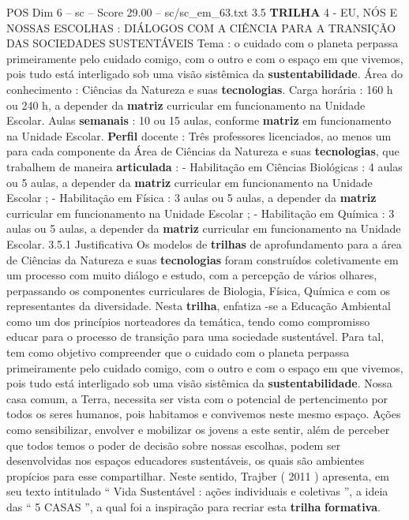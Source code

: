 \begin{textsample}{POS Dim 6 – sc – Score 29.00 – sc/sc\_em\_63.txt}  \label{ex:f6_pos_006}
3.5 \textbf{TRILHA} 4 - EU, NÓS E NOSSAS ESCOLHAS : DIÁLOGOS COM A CIÊNCIA PARA A TRANSIÇÃO DAS SOCIEDADES SUSTENTÁVEIS Tema : o cuidado com o planeta perpassa primeiramente pelo cuidado comigo, com o outro e com o espaço em que vivemos, pois tudo está interligado sob uma visão sistêmica da \textbf{sustentabilidade}.
Área do conhecimento : Ciências da Natureza e suas \textbf{tecnologias}.
Carga horária : 160 h ou 240 h, a depender da \textbf{matriz} curricular em funcionamento na Unidade Escolar.
Aulas \textbf{semanais} : 10 ou 15 aulas, conforme \textbf{matriz} em funcionamento na Unidade Escolar. \textbf{Perfil} docente : Três professores licenciados, ao menos um para cada componente da Área de Ciências da Natureza e suas \textbf{tecnologias}, que trabalhem de maneira \textbf{articulada} : - Habilitação em Ciências Biológicas : 4 aulas ou 5 aulas, a depender da \textbf{matriz} curricular em funcionamento na Unidade Escolar ; - Habilitação em Física : 3 aulas ou 5 aulas, a depender da \textbf{matriz} curricular em funcionamento na Unidade Escolar ; - Habilitação em Química : 3 aulas ou 5 aulas, a depender da \textbf{matriz} curricular em funcionamento na Unidade Escolar. 3.5.1 Justificativa Os modelos de \textbf{trilhas} de aprofundamento para a área de Ciências da Natureza e suas \textbf{tecnologias} foram construídos coletivamente em um processo com muito diálogo e estudo, com a percepção de vários olhares, perpassando os componentes curriculares de Biologia, Física, Química e com os representantes da diversidade.
Nesta \textbf{trilha}, enfatiza -se a Educação Ambiental como um dos princípios norteadores da temática, tendo como compromisso educar para o processo de transição para uma sociedade sustentável.
Para tal, tem como objetivo compreender que o cuidado com o planeta perpassa primeiramente pelo cuidado comigo, com o outro e com o espaço em que vivemos, pois tudo está interligado sob uma visão sistêmica da \textbf{sustentabilidade}.
Nossa casa comum, a Terra, necessita ser vista com o potencial de pertencimento por todos os seres humanos, pois habitamos e convivemos neste mesmo espaço.
Ações como sensibilizar, envolver e mobilizar os jovens a este sentir, além de perceber que todos temos o poder de decisão sobre nossas escolhas, podem ser desenvolvidas nos espaços educadores sustentáveis, os quais são ambientes propícios para esse compartilhar.
Neste sentido, Trajber ( 2011 ) apresenta, em seu texto intitulado “ Vida Sustentável : ações individuais e coletivas ”, a ideia das “ 5 CASAS ”, a qual foi a inspiração para recriar esta \textbf{trilha} \textbf{formativa}.

\end{textsample}
